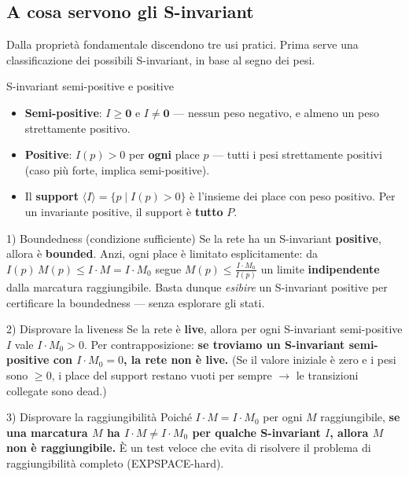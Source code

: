 \subsection{\texorpdfstring{A cosa servono gli S-invariant}{A cosa servono gli S-invariant}}

Dalla proprietà fondamentale discendono tre usi pratici. Prima serve una classificazione dei possibili S-invariant, in base al segno dei pesi.

\begin{boxdefinition}{S-invariant semi-positive e positive}
\begin{itemize}
\item \textbf{Semi-positive}: $I \ge \mathbf{0}$ e $I \ne \mathbf{0}$ — nessun peso negativo, e almeno un peso strettamente positivo.
\item \textbf{Positive}: $I(p) > 0$ per \textbf{ogni} place $p$ — tutti i pesi strettamente positivi (caso più forte, implica semi-positive).
\item Il \textbf{support} $\langle I \rangle = \{p \mid I(p) > 0\}$ è l'insieme dei place con peso positivo. Per un invariante positive, il support è \textbf{tutto} $P$.
\end{itemize}
\end{boxdefinition}

\begin{boxtheorem}{1) Boundedness (condizione sufficiente)}
Se la rete ha un S-invariant \textbf{positive}, allora è \textbf{bounded}. Anzi, ogni place è limitato esplicitamente: da \(I(p)\,M(p) \le I\cdot M = I\cdot M_0\) segue \(M(p) \le \frac{I \cdot M_0}{I(p)}\) un limite \textbf{indipendente} dalla marcatura raggiungibile. Basta dunque \emph{esibire} un S-invariant positive per certificare la boundedness — senza esplorare gli stati.
\end{boxtheorem}

\begin{boxtheorem}{2) Disprovare la liveness}
Se la rete è \textbf{live}, allora per ogni S-invariant semi-positive $I$ vale $I \cdot M_0 > 0$. Per contrapposizione: \textbf{se troviamo un S-invariant semi-positive con $I \cdot M_0 = 0$, la rete non è live.} (Se il valore iniziale è zero e i pesi sono $\ge 0$, i place del support restano vuoti per sempre $\rightarrow$ le transizioni collegate sono dead.)
\end{boxtheorem}

\begin{boxtheorem}{3) Disprovare la raggiungibilità}
Poiché $I \cdot M = I \cdot M_0$ per ogni $M$ raggiungibile, \textbf{se una marcatura $M$ ha $I \cdot M \ne I \cdot M_0$ per qualche S-invariant $I$, allora $M$ non è raggiungibile.} È un test veloce che evita di risolvere il problema di raggiungibilità completo (EXPSPACE-hard).
\end{boxtheorem}

